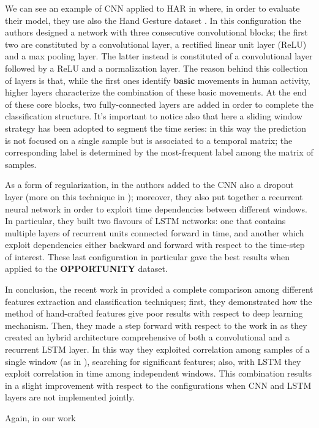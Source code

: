 We can see an example of CNN applied to HAR in \cite{yang2015deep} where, in order to evaluate their model, they use also the Hand Gesture dataset \cite{bulling2014tutorial}. In this configuration the authors designed a network with three consecutive convolutional blocks; the first two are constituted by a convolutional layer, a rectified linear unit layer (ReLU) and a max pooling layer. The latter instead is constituted of a convolutional layer followed by a ReLU and a normalization layer. The reason behind this collection of layers is that, while the first ones identify \textbf{basic} movements in human activity, higher layers characterize the combination of these basic movements. At the end of these core blocks, two fully-connected layers are added in order to complete the classification structure. It's important to notice also that here a sliding window strategy has been adopted to segment the time series: in this way the prediction is not focused on a single sample but is associated to a temporal matrix; the corresponding label is determined by the most-frequent label among the matrix of samples.

As a form of regularization, in \cite{hammerla2016deep} the authors added to the CNN also a dropout layer (more on this technique in \cite{srivastava2014dropout}); moreover, they also put together a recurrent neural network in order to exploit time dependencies between different windows. In particular, they built two flavours of LSTM networks: one that contains multiple layers of recurrent units connected forward in time, and another which exploit dependencies either backward and forward with respect to the time-step of interest. These last configuration in particular gave the best results when applied to the \textbf{OPPORTUNITY} dataset.  

In conclusion, the recent work in \cite{li2018comparison} provided a complete comparison among different features extraction and classification techniques; first, they demonstrated how the method of hand-crafted features give poor results with respect to deep learning mechanism. Then, they made a step forward with respect to the work in \cite{hammerla2016deep} as they created an hybrid architecture comprehensive of both a convolutional and a recurrent LSTM layer. In this way they exploited correlation among samples of a single window (as in \cite{yang2015deep}), searching for significant features; also, with LSTM they exploit correlation in time among independent windows. This combination results in a slight improvement with respect to the configurations when CNN and LSTM layers are not implemented jointly.

Again, in our work